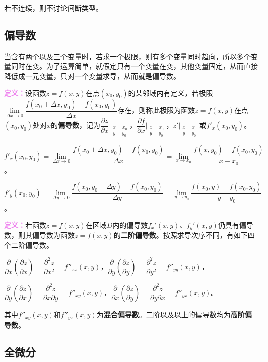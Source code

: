 \documentclass[UTF8, 12pt]{ctexart}
\begin{document}
若不连续，则不讨论间断类型。

\subsection{偏导数}

当含有两个以及三个变量时，若求一个极限，则有多个变量同时趋向，所以多个变量同时在变。为了运算简单，就假定只有一个变量在变，其他变量固定，从而直接降低成一元变量，只对一个变量求导，从而就是偏导数。

\textcolor{violet}{\textbf{定义：}}设函数$z=f(x,y)$在点$(x_0,y_0)$的某邻域内有定义，若极限\\$\lim\limits_{\Delta x\to0}\dfrac{f(x_0+\Delta x,y_0)-f(x_0,y_0)}{\Delta x}$存在，则称此极限为函数$z=f(x,y)$在点$(x_0,y_0)$处对$x$的\textbf{偏导数}，记为$\dfrac{\partial z}{\partial x}\bigg|_{\substack{x=x_0\\y=y_0}}$，$\dfrac{\partial f}{\partial x}\bigg|_{\substack{x=x_0\\y=y_0}}$，$z'\bigg|_{\substack{x=x_0\\y=y_0}}$或$f'_x(x_0,y_0)$。\medskip

$f'_x(x_0,y_0)=\lim\limits_{\Delta x\to0}\dfrac{f(x_0+\Delta x,y_0)-f(x_0,y_0)}{\Delta x}=\lim\limits_{x\to x_0}\dfrac{f(x,y_0)-f(x_0,y_0)}{x-x_0}$。

$f'_y(x_0,y_0)=\lim\limits_{\Delta y\to0}\dfrac{f(x_0,y_0+\Delta y)-f(x_0,y_0)}{\Delta y}=\lim\limits_{y\to y_0}\dfrac{f(x_0,y)-f(x_0,y_0)}{y-y_0}$。

\textcolor{violet}{\textbf{定义：}}若函数$z=f(x,y)$在区域$D$内的偏导数$f_x'(x,y)$、$f_y'(x,y)$仍具有偏导数，则其偏导数为函数$z=f(x,y)$的\textbf{二阶偏导数}。按照求导次序不同，有如下四个二阶偏导数。

$\dfrac{\partial}{\partial x}\left(\dfrac{\partial z}{\partial x}\right)=\dfrac{\partial^2z}{\partial x^2}=f''_{xx}(x,y)$，$\dfrac{\partial}{\partial y}\left(\dfrac{\partial z}{\partial y}\right)=\dfrac{\partial^2z}{\partial y^2}=f''_{yy}(x,y)$，

$\dfrac{\partial}{\partial y}\left(\dfrac{\partial z}{\partial x}\right)=\dfrac{\partial^2z}{\partial x\partial y}=f''_{xy}(x,y)$，$\dfrac{\partial}{\partial x}\left(\dfrac{\partial z}{\partial y}\right)=\dfrac{\partial^2z}{\partial y\partial x}=f''_{yx}(x,y)$。

其中$f''_{xy}(x,y)$和$f''_{yx}(x,y)$为\textbf{混合偏导数}。二阶以及以上的偏导数均为\textbf{高阶偏导数}。

\subsection{全微分}
\end{document}
